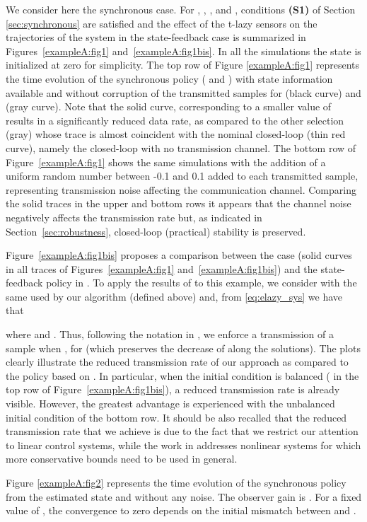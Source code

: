 \documentclass[twocolumn]{autart}
\begin{document}
{

We consider here the synchronous case. For
, ,
, and , conditions \textbf{(S1)} of 
Section \ref{sec:synchronous} are satisfied and the effect of the t-lazy sensors
on the trajectories of the system in the state-feedback case 
is summarized in Figures~\ref{exampleA:fig1}
and~\ref{exampleA:fig1bis}. 
In all the simulations the state  is initialized at zero for simplicity.
The top row
of Figure \ref{exampleA:fig1} represents the time evolution of the
synchronous policy ( and ) with state information available and
without corruption of the transmitted samples for  (black curve) and  (gray curve).
Note that the solid curve, corresponding to a smaller value of 
results in a significantly reduced data rate, as compared to the other
selection (gray) whose trace is almost coincident with the nominal
closed-loop (thin red curve), namely the closed-loop with no transmission
channel. 
The bottom row of Figure~\ref{exampleA:fig1} shows the same
simulations
with the addition of a 
uniform random number between -0.1 and 0.1 added to
 each transmitted sample, representing transmission noise affecting
 the communication channel.
Comparing the solid traces in the upper and bottom rows it appears
that the channel noise negatively affects the transmission rate but,
as indicated in Section~\ref{sec:robustness}, closed-loop (practical) stability is preserved.

Figure~\ref{exampleA:fig1bis}
 proposes a comparison between the case 
 (solid curves in all traces of Figures~\ref{exampleA:fig1} and~\ref{exampleA:fig1bis}) 
and the state-feedback policy in \cite{Tabuada07}.
To apply the results of \cite{Tabuada07} to this
example, we consider  with the same  used by our
algorithm (defined above) and, from 
\eqref{eq:elazy_sys} we have that

where  and . Thus, following the notation in
\cite[Equation (8)]{Tabuada07}, we enforce a transmission of a sample
when , for 
(which preserves
the decrease of  along the solutions).
The plots clearly illustrate the reduced transmission rate of our approach as compared to
the policy based on \cite[Equation (8)]{Tabuada07}.
In particular, when the initial condition is balanced (
in the top row of Figure~\ref{exampleA:fig1bis}), a reduced
transmission rate is already visible. However, the greatest advantage
is experienced with the unbalanced initial condition  of the bottom row.
It should be also recalled that the reduced transmission rate that we
achieve is due to the fact that we restrict our attention to linear
control systems, while the work in \cite{Tabuada07} addresses
nonlinear systems for which more conservative bounds need to be used
in general.

Figure \ref{exampleA:fig2} represents the time evolution of
the synchronous policy from the estimated state  and
without any noise. The observer gain is 
. For a fixed value of , 
the convergence to zero depends on the initial 
mismatch between  and . 
}
\end{document}
